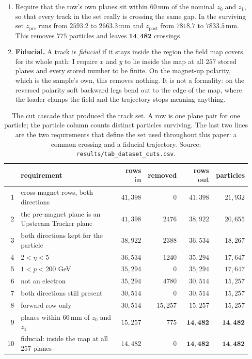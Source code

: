 \documentclass[11pt,a4paper]{article}
\newcommand{\mm}{\ensuremath{\,\mathrm{mm}}}
\begin{document}
\begin{enumerate}
  \item Require that the row's own planes sit within $60\mm$ of the nominal
  $z_0$ and $z_1$, so that every track in the set really is crossing the same
  gap. In the surviving set $z_{\mathrm{pre}}$ runs from $2593.2$ to
  $2663.3\mm$ and $z_{\mathrm{post}}$ from $7818.7$ to $7833.5\mm$. This removes
  $775$ particles and leaves $\mathbf{14{,}482}$ crossings.
  \item \textbf{Fiducial.} A track is \emph{fiducial} if it stays inside the
  region the field map covers for its whole path: I require $x$ and $y$ to lie
  inside the map at all $257$ stored planes and every stored number to be
  finite. On the magnet-up polarity, which is the sample's own, this removes
  nothing. It is not a formality: on the reversed polarity soft backward legs
  bend out to the edge of the map, where the loader clamps the field and the
  trajectory stops meaning anything.
\end{enumerate}

\begin{table}[tbp]
  \centering
  \caption{The cut cascade that produced the track set. A row is one plane pair
  for one particle; the particle column counts distinct particles surviving.
  The last two lines are the two requirements that define the set used
  throughout this paper: a common crossing and a fiducial trajectory.
  Source: \texttt{results/tab\_dataset\_cuts.csv}.}
  \label{tab:cuts}
  \small
  \setlength{\tabcolsep}{4pt}
  \begin{tabular}{rp{6.0cm}rrrr}
    \toprule
    & requirement & rows in & removed & rows out & particles \\
    \midrule
    1 & cross-magnet rows, both directions & $41{,}398$ & $0$ & $41{,}398$ & $21{,}932$ \\
    2 & the pre-magnet plane is an Upstream Tracker plane & $41{,}398$ & $2476$ & $38{,}922$ & $20{,}655$ \\
    3 & both directions kept for the particle & $38{,}922$ & $2388$ & $36{,}534$ & $18{,}267$ \\
    4 & $2 < \eta < 5$ & $36{,}534$ & $1240$ & $35{,}294$ & $17{,}647$ \\
    5 & $1 < p < 200$ GeV & $35{,}294$ & $0$ & $35{,}294$ & $17{,}647$ \\
    6 & not an electron & $35{,}294$ & $4780$ & $30{,}514$ & $15{,}257$ \\
    7 & both directions still present & $30{,}514$ & $0$ & $30{,}514$ & $15{,}257$ \\
    8 & forward row only & $30{,}514$ & $15{,}257$ & $15{,}257$ & $15{,}257$ \\
    9 & planes within $60\mm$ of $z_0$ and $z_1$ & $15{,}257$ & $775$ & $\mathbf{14{,}482}$ & $\mathbf{14{,}482}$ \\
    10 & fiducial: inside the map at all $257$ planes & $14{,}482$ & $0$ & $\mathbf{14{,}482}$ & $\mathbf{14{,}482}$ \\
    \bottomrule
  \end{tabular}
\end{table}
\end{document}

